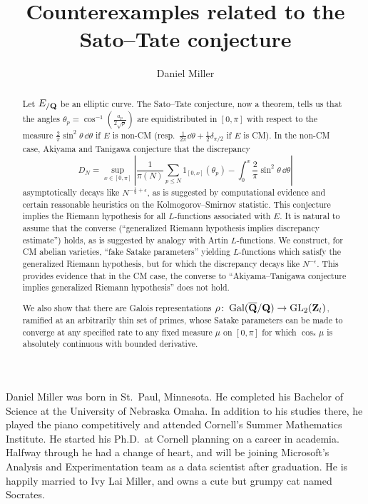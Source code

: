 \documentclass[phd,cornellheadings,tocprelim]{cornell}
\title{Counterexamples related to the Sato--Tate conjecture}
\author{Daniel Miller}
\begin{document}
\maketitle
\makecopyright

\begin{abstract}
Let $E_{/\mathbf{Q}}$ be an elliptic curve. The Sato--Tate conjecture, now a theorem, 
tells us that the angles $\theta_p =\cos^{-1}\left(\frac{a_p}{2\sqrt p}\right)$ 
are equidistributed in $[0,\pi]$ with respect to the measure 
$\frac{2}{\pi}\sin^2\theta\, \dd\theta$ if $E$ is non-CM
(resp.~$\frac{1}{2\pi} \dd \theta + \frac 1 2 \delta_{\pi/2}$ if $E$ is CM). 
In the non-CM case, Akiyama and Tanigawa conjecture that the discrepancy 
\[
	D_N = \sup_{x\in [0,\pi]} \left| \frac{1}{\pi(N)} \sum_{p\leqslant N} 1_{[0,x]}(\theta_p) - \int_0^x \frac{2}{\pi}\sin^2\theta\, \dd\theta\right| 
\]
asymptotically decays like $N^{-\frac 1 2+\epsilon}$, as is suggested by computational 
evidence and certain reasonable heuristics on the Kolmogorov--Smirnov 
statistic. This conjecture implies the Riemann hypothesis 
for all $L$-functions associated with $E$. It is natural to assume that the 
converse (``generalized Riemann hypothesis implies discrepancy estimate'') holds, 
as is suggested by analogy with Artin $L$-functions. We construct, for CM abelian 
varieties, ``fake Satake parameters'' yielding $L$-functions which satisfy 
the generalized Riemann hypothesis, but for which the discrepancy decays like 
$N^{-\epsilon}$. This provides evidence that in the CM case, the converse to 
``Akiyama--Tanigawa conjecture implies generalized Riemann hypothesis'' does 
not hold. 

We also show that there are Galois representations 
$\rho\colon \operatorname{Gal}(\overline {\mathbf{Q}} /\mathbf{Q}) \to \operatorname{GL}_2(\mathbf{Z}_l)$, ramified at an 
arbitrarily thin set of primes, whose Satake parameters can be made to 
converge at any specified rate to any fixed measure $\mu$ on $[0,\pi]$ for 
which $\cos_\ast\mu$ is absolutely continuous with bounded derivative. 
\end{abstract}

\begin{biosketch}
Daniel Miller was born in St.~Paul, Minnesota. He completed his Bachelor of 
Science at the University of Nebraska Omaha. In addition to his studies there, 
he played the piano competitively and attended Cornell's Summer Mathematics 
Institute. He started his Ph.D.~at Cornell planning on a career in academia. 
Halfway through he had a change of heart, and will be joining Microsoft's 
Analysis and Experimentation team as a data scientist after graduation. He is 
happily married to Ivy Lai Miller, and owns a cute but grumpy cat named Socrates. 
\end{biosketch}
\end{document}
